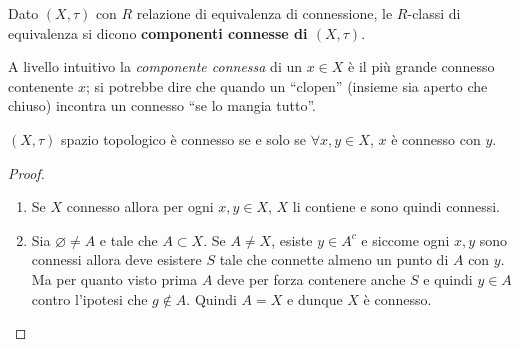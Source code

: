 \begin{definition}
	Dato $(X, \tau)$ con $R$ relazione di equivalenza di connessione, le $R$-classi di equivalenza si dicono \textbf{componenti connesse di $(X, \tau)$}.
\end{definition} 

\begin{remark}
	A livello intuitivo la \textit{componente connessa} di un $x\in X$ è il più grande connesso contenente $x$; si potrebbe dire che quando un \enquote{clopen} (insieme sia aperto che chiuso) incontra un connesso \enquote{se lo mangia tutto}.
\end{remark}

\begin{theorem}
	\label{thr:3.21.4}
	$(X, \tau)$ spazio topologico è connesso se e solo se $\forall x, y \in X$, $x$ è connesso con $y$.
\end{theorem} 
\begin{proof} \
	\begin{enumerate}
		\item Se $X$ connesso allora per ogni $x, y \in X$, $X$ li contiene e sono quindi connessi. 
		\item Sia $\varnothing \neq A$ e tale che $A \subset X$. Se $A \neq X$, esiste $y \in A^c$ e siccome ogni $x, y$ sono connessi allora deve esistere $S$ tale che connette almeno un punto di $A$ con $y$. Ma per quanto visto prima $A$ deve per forza contenere anche $S$ e quindi $y \in A$ contro l'ipotesi che $g \notin A$. Quindi $A = X$ e dunque $X$ è connesso. 
	\end{enumerate}
\end{proof}

